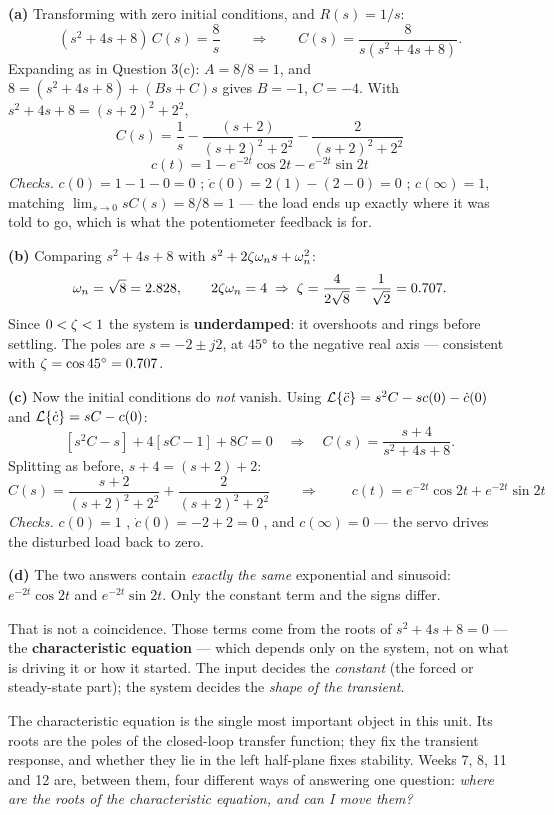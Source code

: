 \documentclass[11pt,a4paper]{article}
\begin{document}
\begin{solution}
\textbf{(a)} Transforming with zero initial conditions, and $R(s)=1/s$:
\[
  (s^{2}+4s+8)\,C(s)=\frac{8}{s}
  \qquad\Longrightarrow\qquad
  C(s)=\frac{8}{s(s^{2}+4s+8)} .
\]
Expanding as in Question 3(c): $A=8/8=1$, and
$8=(s^{2}+4s+8)+(Bs+C)s$ gives $B=-1$, $C=-4$. With
$s^{2}+4s+8=(s+2)^{2}+2^{2}$,
\[
  C(s)=\frac{1}{s}-\frac{(s+2)}{(s+2)^{2}+2^{2}}-\frac{2}{(s+2)^{2}+2^{2}}
\]
\[
  \boxed{\;c(t)=1-e^{-2t}\cos 2t-e^{-2t}\sin 2t\;}
\]
\emph{Checks.} $c(0)=1-1-0=0$ \checkmark;
$\dot c(0)=2(1)-(2-0)=0$ \checkmark; $c(\infty)=1$, matching
$\lim_{s\to 0}sC(s)=8/8=1$ --- the load ends up exactly where it was told to
go, which is what the potentiometer feedback is for.

\medskip
\textbf{(b)} Comparing $s^{2}+4s+8$ with $s^{2}+2\zeta\omega_{n} s+\omega_{n}^{2}$:
\[
  \omega_{n}=\sqrt{8}=2.828,\qquad 2\zeta\omega_{n}=4\;\Rightarrow\;\zeta=\frac{4}{2\sqrt 8}
  =\frac{1}{\sqrt 2}=0.707 .
\]
Since $0<\zeta<1$ the system is \textbf{underdamped}: it overshoots and rings
before settling. The poles are $s=-2\pm j2$, at $\ang{45}$ to the negative real
axis --- consistent with $\zeta=\cos\ang{45}=0.707$.

\medskip
\textbf{(c)} Now the initial conditions do \emph{not} vanish. Using
$\mathcal{L}\{\ddot c\}=s^{2}C-sc(0)-\dot c(0)$ and $\mathcal{L}\{\dot c\}=sC-c(0)$:
\[
  \left[s^{2}C-s\right]+4\left[sC-1\right]+8C=0
  \quad\Longrightarrow\quad
  C(s)=\frac{s+4}{s^{2}+4s+8}.
\]
Splitting as before, $s+4=(s+2)+2$:
\[
  C(s)=\frac{s+2}{(s+2)^{2}+2^{2}}+\frac{2}{(s+2)^{2}+2^{2}}
  \qquad\Longrightarrow\qquad
  \boxed{\;c(t)=e^{-2t}\cos 2t+e^{-2t}\sin 2t\;}
\]
\emph{Checks.} $c(0)=1$ \checkmark, $\dot c(0)=-2+2=0$ \checkmark, and
$c(\infty)=0$ --- the servo drives the disturbed load back to zero.

\medskip
\textbf{(d)} The two answers contain \emph{exactly the same} exponential and
sinusoid: $e^{-2t}\cos 2t$ and $e^{-2t}\sin 2t$. Only the constant term and the
signs differ.

That is not a coincidence. Those terms come from the roots of
$s^{2}+4s+8=0$ --- the \textbf{characteristic equation} --- which depends only
on the system, not on what is driving it or how it started. The input decides
the \emph{constant} (the forced or steady-state part); the system decides the
\emph{shape of the transient}.

\begin{keyidea}
The characteristic equation is the single most important object in this unit.
Its roots are the poles of the closed-loop transfer function; they fix the
transient response, and whether they lie in the left half-plane fixes
stability. Weeks 7, 8, 11 and 12 are, between them, four different ways of
answering one question: \emph{where are the roots of the characteristic
equation, and can I move them?}
\end{keyidea}
\end{solution}
\end{document}

